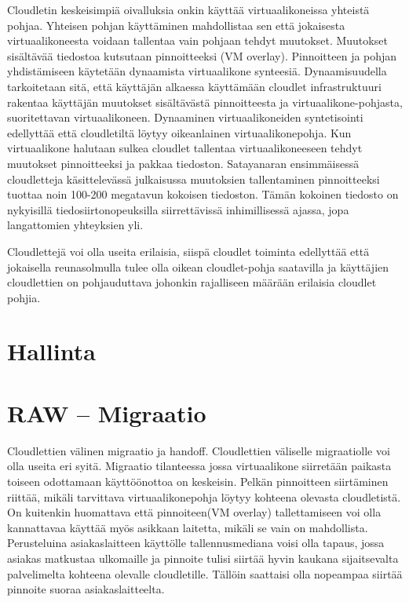 \documentclass[finnish]{tktltiki2}
\theoremstyle{definition}
\theoremstyle{remark}
\begin{document}
Cloudletin keskeisimpiä oivalluksia onkin käyttää virtuaalikoneissa yhteistä pohjaa. 
Yhteisen pohjan käyttäminen mahdollistaa sen että jokaisesta virtuaalikoneesta voidaan tallentaa vain pohjaan tehdyt muutokset.
Muutokset sisältävää tiedostoa kutsutaan pinnoitteeksi (VM overlay).
Pinnoitteen ja pohjan yhdistämiseen käytetään dynaamista virtuaalikone synteesiä.
Dynaamisuudella tarkoitetaan sitä, että käyttäjän alkaessa käyttämään cloudlet infrastruktuuri rakentaa
käyttäjän muutokset sisältävästä pinnoitteesta ja virtuaalikone-pohjasta, suoritettavan virtuaalikoneen. 
Dynaaminen virtuaalikoneiden syntetisointi edellyttää että cloudletiltä löytyy oikeanlainen virtuaalikonepohja.
Kun virtuaalikone halutaan sulkea cloudlet tallentaa virtuaalikoneeseen tehdyt muutokset pinnoitteeksi ja pakkaa tiedoston. 
Satayanaran ensimmäisessä cloudletteja käsittelevässä julkaisussa \cite{satya09} muutoksien tallentaminen pinnoitteeksi tuottaa noin 100-200 megatavun kokoisen tiedoston. Tämän kokoinen tiedosto on nykyisillä tiedosiirtonopeuksilla siirrettävissä inhimillisessä ajassa, jopa langattomien yhteyksien yli.

Cloudlettejä voi olla useita erilaisia, siispä cloudlet toiminta edellyttää että jokaisella reunasolmulla tulee olla oikean cloudlet-pohja saatavilla ja käyttäjien cloudlettien on pohjauduttava johonkin rajalliseen määrään erilaisia cloudlet pohjia.

\chapter*{Hallinta}

\chapter{RAW – Migraatio}

Cloudlettien välinen migraatio ja handoff. 
Cloudlettien väliselle migraatiolle voi olla useita eri syitä.
Migraatio tilanteessa jossa virtuaalikone siirretään paikasta toiseen odottamaan käyttöönottoa on keskeisin.
Pelkän pinnoitteen siirtäminen riittää, mikäli tarvittava virtuaalikonepohja löytyy kohteena olevasta cloudletistä.
On kuitenkin huomattava että pinnoiteen(VM overlay) tallettamiseen voi olla kannattavaa käyttää myös asikkaan laitetta, mikäli se vain on mahdollista.
Perusteluina asiakaslaitteen käyttölle tallennusmediana voisi olla tapaus, jossa asiakas matkustaa ulkomaille ja pinnoite tulisi siirtää hyvin kaukana sijaitsevalta palvelimelta kohteena olevalle cloudletille. Tällöin saattaisi olla nopeampaa siirtää pinnoite suoraa asiakaslaitteelta.
\end{document}

